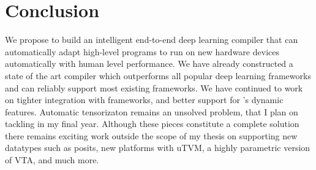 \section{Conclusion}
\label{sec:conclusion}

We propose to build an intelligent end-to-end deep learning compiler that can
automatically adapt high-level programs to run on new hardware devices automatically
with human level performance. We have already constructed a state of the art compiler
which outperforms all popular deep learning frameworks and can reliably support most
existing frameworks. We have continued to work on tighter integration with frameworks,
and better support for \relay's dynamic features. Automatic tensorizaton remains an unsolved
problem, that I plan on tackling in my final year. Although these pieces constitute a
complete solution there remains exciting work outside the scope of my thesis on
supporting new datatypes such as posits, new platforms with uTVM, a highly
parametric version of VTA, and much more.
